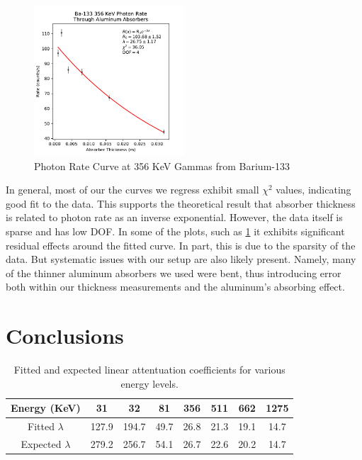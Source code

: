 \documentclass[12pt, letterpaper]{article}
\begin{document}
\begin{figure}[!htb]
    \centering
    \includegraphics[width=0.5\textwidth]{experiment1/figures/ba133/rates-356.pdf}
    \caption{Photon Rate Curve at 356 KeV Gammas from Barium-133}
    \label{fig:rates356}
\end{figure}

In general, most of our the curves we regress exhibit small $\chi^2$ values, indicating good fit to the data. This supports the theoretical result that absorber thickness is related to photon rate as an inverse exponential. However, the data itself is sparse and has low DOF. In some of the plots, such as \ref{fig:rates356} it exhibits significant residual effects around the fitted curve. In part, this is due to the sparsity of the data. But systematic issues with our setup are also likely present. Namely, many of the thinner aluminum absorbers we used were bent, thus introducing error both within our thickness measurements and the aluminum's absorbing effect. 

\section{Conclusions}\label{sec:conclusion}

\begin{table}[h]
\centering
\begin{tabular}{|c | c c c c c c c |}
    \hline
    Energy (KeV) & 31 & 32 & 81 & 356 & 511 & 662 & 1275 \\
    \hline
    Fitted $\lambda$ & 127.9 & 194.7 & 49.7 & 26.8 & 21.3 & 19.1 & 14.7 \\
    Expected $\lambda$ & 279.2 & 256.7 & 54.1 & 26.7 & 22.6 & 20.2 & 14.7 \\
    \hline
\end{tabular}
\caption{Fitted and expected linear attentuation coefficients for various energy levels.}
\label{table:1}
\end{table}
\end{document}
